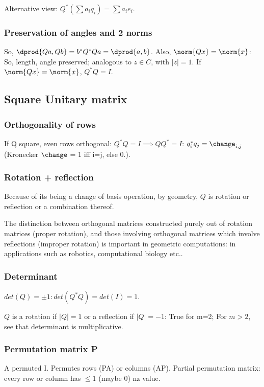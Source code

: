 \documentclass[oneside, article]{memoir}
\begin{document}
Alternative view: $Q^{*}(\sum a_{i}q_{i}) = \sum a_{i}e_{i}$.

\subsubsection{Preservation of angles and 2 norms}
So, $\dprod{Qa, Qb} = b^{*}Q^{*}Qa = \dprod{a,b}$. Also, $\norm{Qx} = \norm{x}$: So, length, angle preserved; analogous to $z \in C$, with $|z| = 1$. If $\norm{Qx} = \norm{x}$, $Q^{*}Q = I$.

\subsection{Square Unitary matrix}
\subsubsection{Orthogonality of rows}
If Q square, even rows orthogonal: $Q^{*}Q=I \implies QQ^{*}=I$: $q_{i}^{*}q_{j} = \change_{i,j}$ (Kronecker $\change$ = 1 iff i=j, else 0.).

\subsubsection{Rotation + reflection}
Because of its being a change of basis operation, by geometry, $Q$ is rotation or reflection or a combination thereof. 

The distinction between orthogonal matrices constructed purely out of rotation matrices (proper rotation), and those involving orthogonal matrices which involve reflections (improper rotation) is important in geometric computations: in applications such as robotics, computational biology etc..

\subsubsection{Determinant}
$det(Q) = \pm1 : det(Q^{*}Q) = det(I) = 1$.

$Q$ is a rotation if $|Q|=1$ or a reflection if $|Q|=-1$: True for m=2; For $m >2$, see that determinant is multiplicative.

\subsubsection{Permutation matrix P}
A permuted I. Permutes rows (PA) or columns (AP). Partial permutation matrix: every row or column has $\leq 1$ (maybe 0) nz value.
\end{document}
